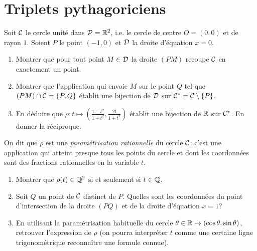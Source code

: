 \documentclass[a4paper,11pt,reqno]{amsart}
\begin{document}
\section{Triplets pythagoriciens}

\begin{exo}\label{cerclerat} Soit $\mathcal{C}$ le cercle unité dans $\mathcal{P}=\mathbb{R}^2$, i.e. le cercle de centre $O=(0,0)$ et de rayon $1$. Soient $P$ le point $(-1,0)$ et $\mathcal{D}$ la droite d'équation $x=0$.
 \begin{enumerate}
  \item Montrer que pour tout point $M \in \mathcal{D}$ la droite $(PM)$ recoupe $\mathcal{C}$ en exactement un point.
  \item Montrer que l'application qui envoie $M$ sur le point $Q$ tel que $(PM) \cap \mathcal{C} =\{P,Q\}$ établit une bijection de $\mathcal{D}$ sur $\mathcal{C}^\ast=\mathcal{C} \setminus \{P\}$.
  \item En déduire que $\displaystyle{\rho \colon t \longmapsto \left( \frac{1-t^2}{1+t^2}, \frac{2t}{1+t^2}\right)}$ établit une bijection de $\mathbb{R}$ sur $\mathcal{C}^\ast$. En donner la réciproque.
 \end{enumerate}
On dit que $\rho$ est une \emph{paramétrisation rationnelle} du cercle $\mathcal{C}$: c'est une application qui atteint presque tous les points du cercle et dont les coordonnées sont des fractions rationnelles en la variable $t$.
 \begin{enumerate}
 \setcounter{enumi}3
  \item Montrer que $\rho(t) \in \mathbb{Q}^2$ si et seulement si $t \in \mathbb{Q}$.
  \item Soit $Q$ un point de $\mathcal{C}$ distinct de $P$. Quelles sont les coordonnées du point d'intersection de la droite $(PQ)$ et de la droite d'équation $x=1$?
  \item En utilisant la paramétrisation habituelle du cercle $\theta \in \mathbb{R} \mapsto (\cos \theta,\sin \theta)$, retrouver l'expression de $\rho$ (on pourra interpréter $t$ comme une certaine ligne trigonométrique reconna\^itre une formule connue).
 \end{enumerate}

\end{exo}
\end{document}
